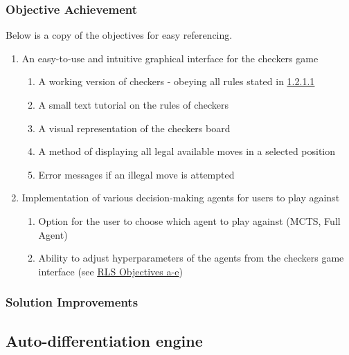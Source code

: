\documentclass{article}
\newcommand{\myhy}[2]{\hyperref[#1]{\color{black}\setulcolor{black}\ul{#2}}}
\begin{document}
    \subsubsection{Objective Achievement}
    Below is a copy of the objectives for easy referencing.
    \begin{enumerate}
        \item An easy-to-use and intuitive graphical interface for the checkers game
        \begin{enumerate}
            \item A working version of checkers - obeying all rules stated in \myhy{checkers}{1.2.1.1}
            \item A small text tutorial on the rules of checkers
            \item A visual representation of the checkers board
            \item A method of displaying all legal available moves in a selected position
            \item Error messages if an illegal move is attempted
        \end{enumerate}
        \item Implementation of various decision-making agents for users to play against
        \begin{enumerate}
            \item Option for the user to choose which agent to play against (MCTS, Full Agent)
            \item Ability to adjust hyperparameters of the agents from the checkers game interface (see \myhy{RLS Objs}{RLS Objectives a-e})
        \end{enumerate}
    \end{enumerate}

    \subsubsection{Solution Improvements}



    \subsection{Auto-differentiation engine}
\end{document}
